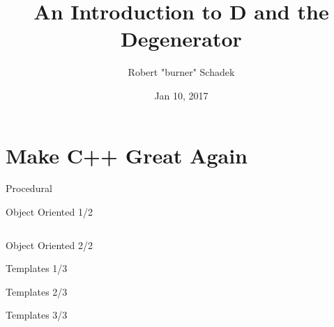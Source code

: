 \documentclass[xelatex,10pt]{beamer}
\title{An Introduction to D and the Degenerator}
\author{Robert "burner" Schadek}
\date{Jan 10, 2017}
\begin{document}
\maketitle

\section{Make C++ Great Again}
\begin{frame}{Procedural}

\end{frame}

\begin{frame}{Object Oriented 1/2}
\begin{columns}[T]
\begin{column}{0.49\linewidth}

\end{column}
\begin{column}{0.50\linewidth}

\end{column}
\end{columns}
\end{frame}

\begin{frame}{Object Oriented 2/2}


\end{frame}

\begin{frame}{Templates 1/3}

\end{frame}

\begin{frame}{Templates 2/3}

\end{frame}

\begin{frame}{Templates 3/3}

\end{frame}
\end{document}
